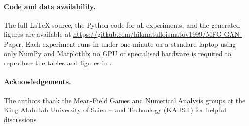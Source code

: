 \paragraph{Code and data availability.}
The full LaTeX source, the Python code for all experiments, and the
generated figures are available at
\url{https://github.com/hikmatulloismatov1999/MFG-GAN-Paper}.
Each experiment runs in under one minute on a standard laptop using only
NumPy and Matplotlib; no GPU or specialised hardware is required to
reproduce the tables and figures in .

\paragraph{Acknowledgements.}
The authors thank the Mean-Field Games and Numerical Analysis groups at
the King Abdullah University of Science and Technology (KAUST) for
helpful discussions.
